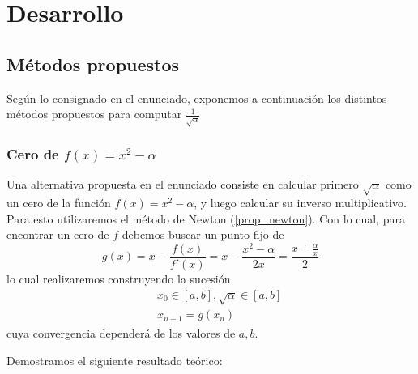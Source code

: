 \section{Desarrollo}
	\subsection{Métodos propuestos}
	Según lo consignado en el enunciado, exponemos a continuación los distintos métodos propuestos para computar $\frac{1}{\sqrt{\alpha}}$
		\subsubsection{Cero de $f(x) = x^2 -\alpha$}
		Una alternativa propuesta en el enunciado consiste en calcular primero $\sqrt{\alpha}$ como un cero de la función $f(x) = x^2 -\alpha$, y luego calcular su inverso multiplicativo. Para esto utilizaremos el método de Newton (\ref{prop_newton}). Con lo cual, para encontrar un cero de $f$ debemos buscar un punto fijo de 
		\begin{equation}
			g(x) = x - \frac{f(x)}{f'(x)} = x - \frac{x^2 - \alpha}{2x} = \frac{x + \frac{\alpha}{x}}{2}
		\label{g}	
		\end{equation}
lo cual realizaremos construyendo la sucesión
	\begin{eqnarray}
		&& x_0 \in [a,b], \sqrt{\alpha} \in [a,b] \nonumber \\
		&& x_{n+1} = g(x_n) 
		\label{sqrtNewt}
	\end{eqnarray}
cuya convergencia dependerá de los valores de $a,b$. 

Demostramos el siguiente resultado teórico:

